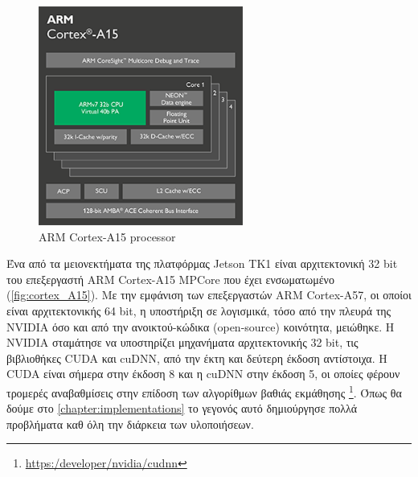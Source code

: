 \begin{figure}[!ht]
  \centering
  \includegraphics[width=0.6\textwidth]{./images/chapter4/cortex_A15_chip_diagram.png}
  \caption[ARM Cortex-A15 processor]{ARM Cortex-A15 processor}
  \label{fig:cortex_A15}
\end{figure}

Ένα από τα μειονεκτήματα της πλατφόρμας Jetson TK1 είναι αρχιτεκτονική 32 bit του επεξεργαστή ARM Cortex-A15 MPCore
που έχει ενσωματωμένο (\autoref{fig:cortex_A15}). Με την εμφάνιση των επεξεργαστών ARM Cortex-A57, 
οι οποίοι είναι αρχιτεκτονικής 64 bit,
η υποστήριξη σε λογισμικά, τόσο από την πλευρά της NVIDIA όσο και από την ανοικτού-κώδικα (open-source) κοινότητα, μειώθηκε.
Η NVIDIA σταμάτησε να υποστηρίζει μηχανήματα αρχιτεκτονικής 32 bit, τις βιβλιοθήκες CUDA και cuDNN,
από την έκτη και δεύτερη έκδοση αντίστοιχα. Η CUDA είναι σήμερα στην έκδοση 8 και η cuDNN στην έκδοση 5,
οι οποίες φέρουν τρομερές αναβαθμίσεις στην επίδοση των αλγορίθμων βαθιάς εκμάθησης
\footnote{\href{https:/developer/nvidia/cudnn}{https:/developer/nvidia/cudnn}}.
Όπως θα δούμε στο \autoref{chapter:implementations} το γεγονός αυτό δημιούργησε πολλά
προβλήματα καθ όλη την διάρκεια των υλοποιήσεων.
